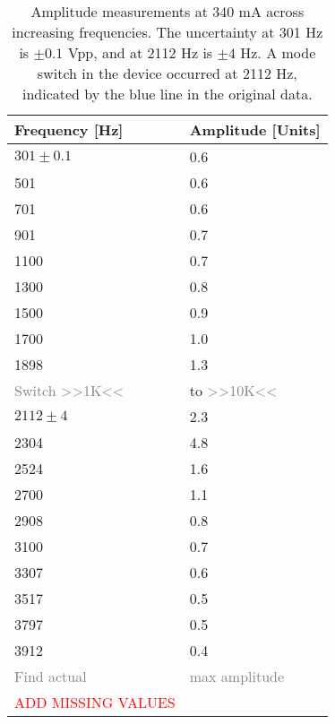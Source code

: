 \begin{table}[h!]
    \centering
    \begin{tabular}{l|l}
        \hline
        \textbf{Frequency [Hz]} & \textbf{Amplitude [Units]} \\
        \hline
        $301 \pm 0.1$ & 0.6 \\
        501           & 0.6 \\
        701           & 0.6 \\
        901           & 0.7 \\
        1100          & 0.7 \\
        1300          & 0.8 \\
        1500          & 0.9 \\
        1700          & 1.0 \\
        1898          & 1.3 \\
        \rowcolor{blue!20} \textcolor{gray}{Switch >>1K<<} & to \textcolor{gray}{>>10K<<}\\
        $2112 \pm 4$  & 2.3 \\
        2304          & 4.8 \\
        2524          & 1.6 \\
        2700          & 1.1 \\
        2908          & 0.8 \\
        3100          & 0.7 \\
        3307          & 0.6 \\
        3517          & 0.5 \\
        3797          & 0.5 \\
        3912          & 0.4 \\
        \hline
        \hline
        \rowcolor{red!20} \textcolor{gray}{Find actual} & \textcolor{gray}{max amplitude}\\
        \textcolor{red}{ADD MISSING VALUES}
    \end{tabular}
    \caption{Amplitude measurements at 340 mA across increasing frequencies. The uncertainty at 301 Hz is $\pm 0.1$ Vpp, and at 2112 Hz is $\pm 4$ Hz. A mode switch in the device occurred at 2112 Hz, indicated by the blue line in the original data.}
    \label{tab:340mA_mode_switch}
\end{table}


\label{tab:yes_i_nee_to_add_english_labels_now_well_actually_i_could_still_make_them_german_but_this_feels_illigal_HELP_ME_if_you_will_ever_find_this_HELP_ME_I_am_going_crazy_hahahahahahahaha_just_kidding}